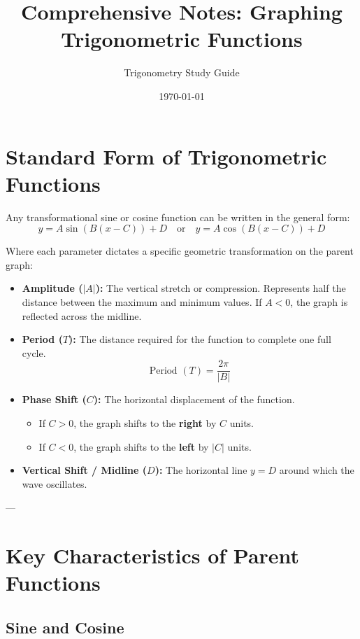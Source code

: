 \documentclass[11pt, a4paper]{article}
\title{\textbf{\color{primary} Comprehensive Notes: Graphing Trigonometric Functions}}
\author{Trigonometry Study Guide}
\date{\today}
\begin{document}
\maketitle

\section{Standard Form of Trigonometric Functions}

Any transformational sine or cosine function can be written in the general form:
\begin{equation*}
y = A \sin(B(x - C)) + D \quad \text{or} \quad y = A \cos(B(x - C)) + D
\end{equation*}

Where each parameter dictates a specific geometric transformation on the parent graph:

\begin{itemize}
    \item \textbf{Amplitude ($|A|$):} The vertical stretch or compression. Represents half the distance between the maximum and minimum values. If $A < 0$, the graph is reflected across the midline.
    \item \textbf{Period ($T$):} The distance required for the function to complete one full cycle.
    \begin{equation*}
    \text{Period } (T) = \frac{2\pi}{|B|}
    \end{equation*}
    \item \textbf{Phase Shift ($C$):} The horizontal displacement of the function.
    \begin{itemize}
        \item If $C > 0$, the graph shifts to the \textbf{right} by $C$ units.
        \item If $C < 0$, the graph shifts to the \textbf{left} by $|C|$ units.
    \end{itemize}
    \item \textbf{Vertical Shift / Midline ($D$):} The horizontal line $y = D$ around which the wave oscillates.
\end{itemize}

---

\section{Key Characteristics of Parent Functions}

\subsection{Sine and Cosine}
\end{document}
